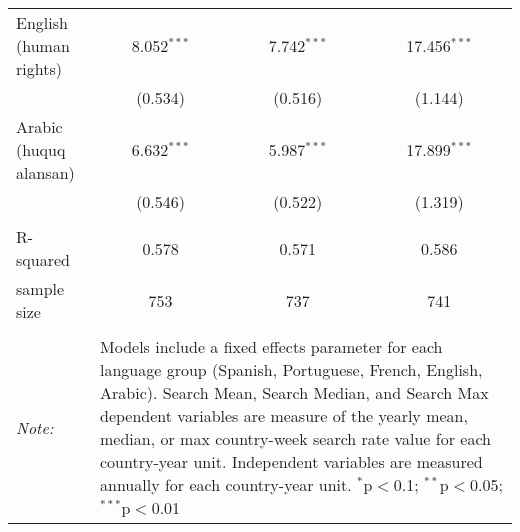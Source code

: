 \begin{table}[!htbp]
\begin{tabular}{@{\extracolsep{5pt}}lccc}
  English (human rights) & 8.052$^{***}$ & 7.742$^{***}$ & 17.456$^{***}$ \\ 
  & (0.534) & (0.516) & (1.144) \\ 
  Arabic (huquq alansan) & 6.632$^{***}$ & 5.987$^{***}$ & 17.899$^{***}$ \\ 
  & (0.546) & (0.522) & (1.319) \\ 
 \hline \\[-1.8ex] 
R-squared  & 0.578 & 0.571 & 0.586 \\ 
sample size  & 753 & 737 & 741 \\ 
\hline 
\hline \\[-1.8ex] 
\textit{Note:}  & \multicolumn{3}{l}{\parbox[t]{8cm}{Models include a fixed effects parameter for each language group (Spanish, Portuguese, French, English, Arabic). Search Mean, Search Median, and Search Max dependent variables are measure of the yearly mean, median, or max country-week search rate value for each country-year unit. Independent variables are measured annually for each country-year unit. $^{*}$p$<$0.1; $^{**}$p$<$0.05; $^{***}$p$<$0.01}} \\ 
\end{tabular} 
\end{table} 
